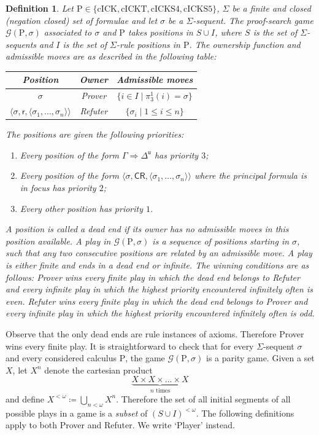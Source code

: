 \documentclass{myifcolog}
\renewcommand{\u}{\mathsf{u}}
\newcommand{\hickp}{\mathrm{P}}
\newcommand{\cick}{\mathrm{cICK}}
\newcommand{\cickt}{\mathrm{cICKT}}
\newcommand{\cicks}{\mathrm{cICKS4}}
\newcommand{\cickss}{\mathrm{cICKS5}}
\newtheorem{definition}[theorem]{Definition}
\numberwithin{theorem}{section}
\begin{document}
	\begin{definition}
		Let $\hickp \in \{\cick, \cickt, \cicks, \cickss\}$, $\Sigma$ be a finite and closed (negation closed) set of formulae and let $\sigma$ be a $\Sigma$-sequent. The \emph{proof-search game} $\mathscr{G}(\hickp,\sigma)$ associated to $\sigma$ and $\hickp$ takes positions in $S \cup I$, where $S$ is the set of $\Sigma$-sequents and $I$ is the set of $\Sigma$-rule positions in $\hickp$. The ownership function and admissible moves are as described in the following table:
		\begin{center}
			\begin{tabular}{|c|c|c|}
				\hline
				Position & Owner & Admissible moves \\
				\hline
				$\sigma$ & Prover & $\{i \in I \mid \pi_3^1(i) = \sigma\}$ \\
				$\langle \sigma, \mathsf{r}, \langle \sigma_1, \ldots, \sigma_n \rangle\rangle$ & Refuter & $\{\sigma_i \mid 1 \leq i \leq n\}$\\
				\hline 
			\end{tabular}
		\end{center}
		The positions are given the following priorities:
		\begin{enumerate}
			\item Every position of the form $\Gamma \Rightarrow \Delta^\u$ has priority $3$;
			\item Every position of the form $\langle\sigma, \mathsf{C R}, \langle \sigma_1, \ldots, \sigma_n \rangle\rangle$ where the principal formula is in focus has priority $2$;
			\item Every other position has priority $1$.
		\end{enumerate}
		A position is called a \emph{dead end} if its owner has no admissible moves in this position available. A \emph{play} in $\mathscr{G}(\hickp,\sigma)$ is a sequence of positions starting in $\sigma$, such that any two consecutive positions are related by an admissible move. A play is either finite and ends in a dead end or infinite. The \emph{winning conditions} are as follows: Prover wins every finite play in which the dead end belongs to Refuter and every infinite play in which the highest priority encountered infinitely often is even. Refuter wins every finite play in which the dead end belongs to Prover and every infinite play in which the highest priority encountered infinitely often is odd.
	\end{definition}
     
  
Observe that the only dead ends are rule instances of axioms. Therefore Prover wins every finite play. It is straightforward to check that for every $\Sigma$-sequent $\sigma$ and every considered calculus $\hickp$, the game $\mathscr{G}(\hickp,\sigma)$ is a parity game. Given a set $X$, let $X^n$ denote the cartesian product 
\begin{equation*}
   \underbrace{X \times X \times ... \times X}_{n \text{ times}} 
\end{equation*} 
and define $X^{< \omega} \coloneqq \bigcup_{n < \omega} X^n$. Therefore the set of all initial segments of all possible plays in a game is a \emph{subset} of $(S \cup I)^{< \omega}$. The following definitions apply to both Prover and Refuter. We write `Player' instead.
\end{document}
